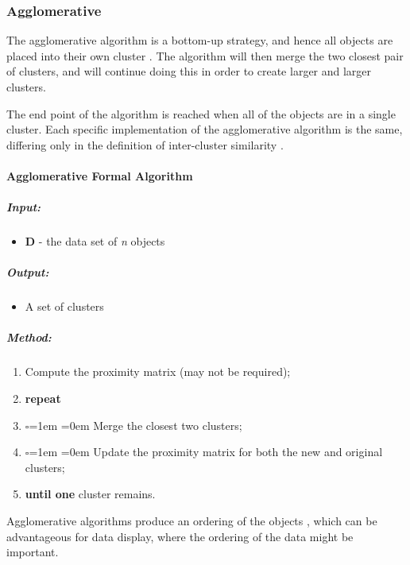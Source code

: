 \subsubsection{Agglomerative}
The agglomerative algorithm is a bottom-up strategy, and hence all objects are 
placed into their own cluster \citep{tan05}. The algorithm will then merge the 
two closest pair of clusters, and will continue doing this in order to create 
larger and larger clusters. 

The end point of the algorithm is reached when all of the objects are in a 
single cluster. Each specific implementation of the agglomerative algorithm 
is the same, differing only in the definition of inter-cluster similarity 
\citep{tan05}.

\paragraph*{Agglomerative Formal Algorithm}
\subparagraph*{Input:}
\begin{itemize}
  \item {\bf D} - the data set of {\em n} objects
\end{itemize}

\subparagraph*{Output:}
\begin{itemize}
  \item A set of clusters
\end{itemize}

\subparagraph*{Method:}
\begin{enumerate}
  \item Compute the proximity matrix (may not be required);
  \item {\bf repeat}
  \item \begin{list}{$\square$}{\leftmargin=1em \itemindent=0em}
          Merge the closest two clusters;
        \end{list}
  \item \begin{list}{$\square$}{\leftmargin=1em \itemindent=0em}
          Update the proximity matrix for both the new and original clusters;
        \end{list}
  \item {\bf until one} cluster remains.
\end{enumerate}

Agglomerative algorithms produce an ordering of the objects 
\citep{iosHierarchical}, which can be advantageous for data display, where the 
ordering of the data might be important. 

